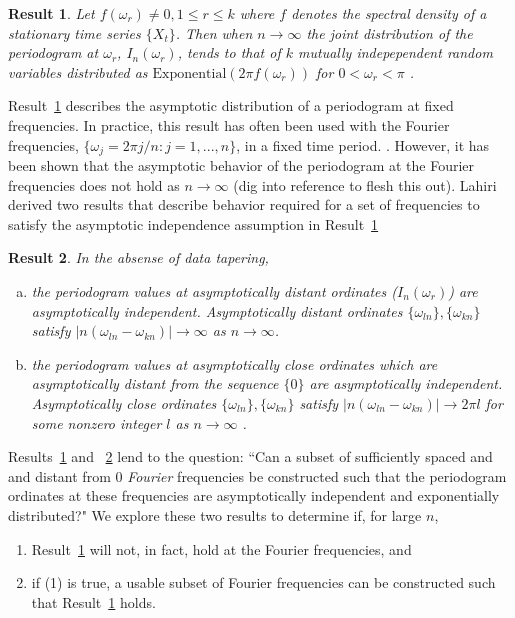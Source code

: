 \documentclass{article}\usepackage{graphicx, color}
\newcommand{\mj}[1]{{\color{blue} #1}}
\theoremstyle{plain}
\newtheorem{res}{Result}
\begin{document}
\begin{res} \label{res:first}
Let $f(\omega_r) \not= 0, 1 \le r \le k$ where $f$ denotes the spectral density of a stationary time series $\{X_t\}$. Then when $n\rightarrow \infty$ the joint distribution of the periodogram at $\omega_r$, $I_n(\omega_r)$, tends to that of $k$ mutually indepependent random variables distributed as $\text{Exponential}(2\pi f(\omega_r))$ for $0<\omega_r<\pi$ \cite{brockwell2002introduction}. 
\end{res}

Result~\ref{res:first} describes the asymptotic distribution of a periodogram at fixed frequencies. In practice, this result has often been used with the Fourier frequencies, $\{\omega_j = 2\pi j/n : j=1,...,n\}$, in a fixed time period. \mj{\cite{brockwell2002introduction}}. However, it has been shown that the asymptotic behavior of the periodogram at the Fourier frequencies does not hold as $n \rightarrow \infty$ \mj{(dig into reference to flesh this out)}. Lahiri \cite{lahiri2003necessary} derived two results that describe behavior required for a set of frequencies to satisfy the asymptotic independence assumption in Result~\ref{res:first}

\begin{res} \label{res:lahiri}
In the absense of data tapering,
\begin{enumerate}[(a)]
\item the periodogram values at asymptotically distant ordinates ($I_n(\omega_r)$) are asymptotically independent.  Asymptotically distant ordinates $\{\omega_{ln}\}, \{\omega_{kn}\}$ satisfy $|n(\omega_{ln} - \omega_{kn})| \rightarrow \infty$ as $n \rightarrow \infty$.

\item the periodogram values at asymptotically close ordinates which are asymptotically distant from the sequence $\{0\}$ are asymptotically independent. Asymptotically close ordinates $\{\omega_{ln}\}, \{\omega_{kn}\}$ satisfy $|n(\omega_{ln} - \omega_{kn})| \rightarrow 2\pi l$ for some nonzero integer $l$ as $n \rightarrow \infty$ \cite{lahiri2003necessary}.
\end{enumerate}
\end{res}


Results~\ref{res:first} and ~\ref{res:lahiri} lend to the question: ``Can a subset of sufficiently spaced and and distant from 0 \textit{Fourier} frequencies be constructed such that the periodogram ordinates at these frequencies are asymptotically independent and exponentially distributed?" We explore these two results to determine if, for large $n$,
\begin{enumerate}
  \item Result~\ref{res:first} will not, in fact, hold at the Fourier frequencies, and
  \item if (1) is true, a \mj{usable} subset of Fourier frequencies can be constructed such that Result~\ref{res:first} holds.
\end{enumerate}
\end{document}

